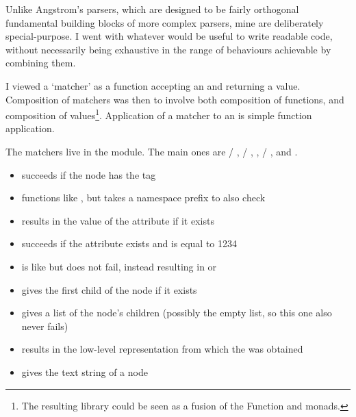 \documentclass[12pt,a4paper,twoside,openright]{report}
\begin{document}
{Unlike Angstrom's parsers, which are designed to be fairly orthogonal fundamental building blocks of more complex parsers, mine are deliberately special-purpose. I went with whatever would be useful to write readable code, without necessarily being exhaustive in the range of behaviours achievable by combining them.

I viewed a `matcher' as a function accepting an  and returning a  value. Composition of matchers was then to involve both composition of functions, and composition of  values\footnote{The resulting library could be seen as a fusion of the Function and  monads.}. Application of a matcher to an  is simple function application.

The matchers live in the  module. The main ones are  / ,  / , ,  / ,  and .

\begin{itemize}
  \item {} succeeds if the node has the  tag

  \item {} functions like , but takes a namespace prefix to also check

  \item {} results in the value of the  attribute if it exists

  \item {} succeeds if the  attribute exists and is equal to 1234

  \item {} is like  but does not fail, instead resulting in  or 

  \item {} gives the first child of the node if it exists

  \item {} gives a list of the node's children (possibly the empty list, so this one also never fails)

  \item {} results in the low-level  representation from which the  was obtained

  \item {} gives the text string of a  node
\end{itemize}

}
\end{document}
